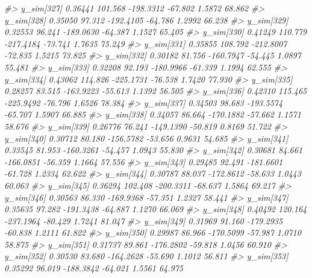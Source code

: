 \documentclass[
  10pt,
  italian,
  a4paper,
  extrafontsizes,onecolumn,openright
  ]{memoir}
\newenvironment{Shaded}{\begin{snugshade}}{\end{snugshade}}
\newcommand{\CommentTok}[1]{\textcolor[rgb]{0.56,0.35,0.01}{\textit{#1}}}
\begin{document}
\begin{Shaded}
\begin{Highlighting}[]
\CommentTok{\#\textgreater{}   y\_sim[327]  0.36441 101.568 {-}198.3312 {-}67.802  1.5872 68.862}
\CommentTok{\#\textgreater{}   y\_sim[328]  0.35050  97.312 {-}192.4105 {-}64.786  1.2992 66.238}
\CommentTok{\#\textgreater{}   y\_sim[329]  0.32553  96.241 {-}189.0630 {-}64.387  1.1527 65.405}
\CommentTok{\#\textgreater{}   y\_sim[330]  0.41249 110.779 {-}217.4184 {-}73.741  1.7635 75.249}
\CommentTok{\#\textgreater{}   y\_sim[331]  0.35855 108.792 {-}212.8007 {-}72.835  1.5215 73.825}
\CommentTok{\#\textgreater{}   y\_sim[332]  0.30182  81.756 {-}160.7947 {-}54.445  1.0897 55.481}
\CommentTok{\#\textgreater{}   y\_sim[333]  0.32208  92.193 {-}180.9966 {-}61.339  1.1994 62.555}
\CommentTok{\#\textgreater{}   y\_sim[334]  0.43062 114.826 {-}225.1731 {-}76.538  1.7420 77.930}
\CommentTok{\#\textgreater{}   y\_sim[335]  0.28257  83.515 {-}163.9223 {-}55.613  1.1392 56.505}
\CommentTok{\#\textgreater{}   y\_sim[336]  0.42310 115.465 {-}225.9492 {-}76.796  1.6526 78.384}
\CommentTok{\#\textgreater{}   y\_sim[337]  0.34503  98.683 {-}193.5574 {-}65.707  1.5907 66.885}
\CommentTok{\#\textgreater{}   y\_sim[338]  0.34057  86.664 {-}170.1882 {-}57.662  1.1571 58.676}
\CommentTok{\#\textgreater{}   y\_sim[339]  0.26776  76.241 {-}149.1390 {-}50.819  0.8169 51.722}
\CommentTok{\#\textgreater{}   y\_sim[340]  0.30712  80.180 {-}156.5782 {-}53.656  0.9631 54.685}
\CommentTok{\#\textgreater{}   y\_sim[341]  0.33545  81.953 {-}160.3261 {-}54.457  1.0943 55.830}
\CommentTok{\#\textgreater{}   y\_sim[342]  0.30681  84.661 {-}166.0851 {-}56.359  1.1664 57.556}
\CommentTok{\#\textgreater{}   y\_sim[343]  0.29485  92.491 {-}181.6601 {-}61.728  1.2334 62.622}
\CommentTok{\#\textgreater{}   y\_sim[344]  0.30787  88.037 {-}172.8612 {-}58.633  1.0443 60.063}
\CommentTok{\#\textgreater{}   y\_sim[345]  0.36294 102.408 {-}200.3311 {-}68.637  1.5864 69.217}
\CommentTok{\#\textgreater{}   y\_sim[346]  0.30563  86.330 {-}169.9368 {-}57.351  1.2327 58.441}
\CommentTok{\#\textgreater{}   y\_sim[347]  0.35635  97.282 {-}191.3438 {-}64.887  1.1270 66.069}
\CommentTok{\#\textgreater{}   y\_sim[348]  0.40492 120.164 {-}237.1964 {-}80.429  1.7241 81.047}
\CommentTok{\#\textgreater{}   y\_sim[349]  0.31969  91.160 {-}179.2935 {-}60.838  1.2111 61.822}
\CommentTok{\#\textgreater{}   y\_sim[350]  0.29987  86.966 {-}170.5099 {-}57.987  1.0710 58.875}
\CommentTok{\#\textgreater{}   y\_sim[351]  0.31737  89.861 {-}176.2802 {-}59.818  1.0456 60.910}
\CommentTok{\#\textgreater{}   y\_sim[352]  0.30530  83.680 {-}164.2628 {-}55.690  1.1012 56.811}
\CommentTok{\#\textgreater{}   y\_sim[353]  0.35292  96.019 {-}188.3842 {-}64.021  1.5561 64.975}

\end{Highlighting}
\end{Shaded}
\end{document}
